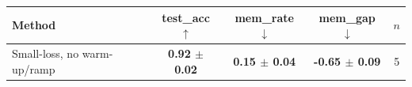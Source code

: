 \begin{tabular}{lcccc}
\toprule
Method & test\_acc $\uparrow$ & mem\_rate $\downarrow$ & mem\_gap $\downarrow$ & $n$ \\
\midrule
Small-loss, no warm-up/ramp & \textbf{0.92 $\pm$ 0.02} & \textbf{0.15 $\pm$ 0.04} & \textbf{-0.65 $\pm$ 0.09} & 5 \\
\bottomrule
\end{tabular}

